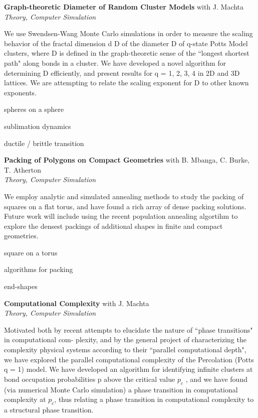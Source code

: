 \documentclass[10pt]{article}
\newcommand{\blankline}{\quad\pagebreak[3]}
\newcommand{\halfblankline}{\quad\vspace{-0.5\baselineskip}\pagebreak[3]}
\begin{document}
\blankline

\textbf{Graph-theoretic Diameter of Random Cluster Models} \hfill {with J. Machta} \\
\emph{Theory, Computer Simulation} 

\halfblankline

We use Swendsen-Wang Monte Carlo simulations in order to measure the scaling behavior of the fractal
dimension d D of the diameter D of q-state Potts Model clusters, where D is defined in the graph-theoretic
sense of the ``longest shortest path" along bonds in a cluster. We have developed a novel algorithm for
determining D efficiently, and present results for q = 1, 2, 3, 4 in 2D and 3D lattices. We are attempting to
relate the scaling exponent for D to other known exponents.
    \begin{innerlist}
        \item spheres on a sphere
        \item sublimation dynamics
        \item ductile / brittle transition

\end{innerlist}

\blankline

\textbf{Packing of Polygons on Compact Geometries} \hfill {with B. Mbanga, C. Burke, T. Atherton} \\
\emph{Theory, Computer Simulation} 

\halfblankline

We employ analytic and simulated annealing methods to study the packing of squares on a flat torus, and
have found a rich array of dense packing solutions. Future work will include using the recent population
annealing algortihm to explore the densest packings of additional shapes in finite and compact geometries.
    \begin{innerlist}
        \item square on a torus
        \item algorithms for packing
        \item end-shapes

\end{innerlist}

\blankline

\textbf{Computational Complexity} \hfill {with J. Machta} \\
\emph{Theory, Computer Simulation} 

\halfblankline

Motivated both by recent attempts to elucidate the nature of ``phase transitions" in computational com-
plexity, and by the general project of characterizing the complexity physical systems according to their
``parallel computational depth", we have explored the parallel computational complexity of the Percolation
(Potts q = 1) model. We have developed an algorithm for identifying infinite clusters at bond occupation
probabilities p above the critical value $p_{c}$ , and we have found (via numerical Monte Carlo simulation) a
phase transition in computational complexity at $p_{c}$, thus relating a phase transition in computational
complexity to a structural phase transition.
\end{document}
